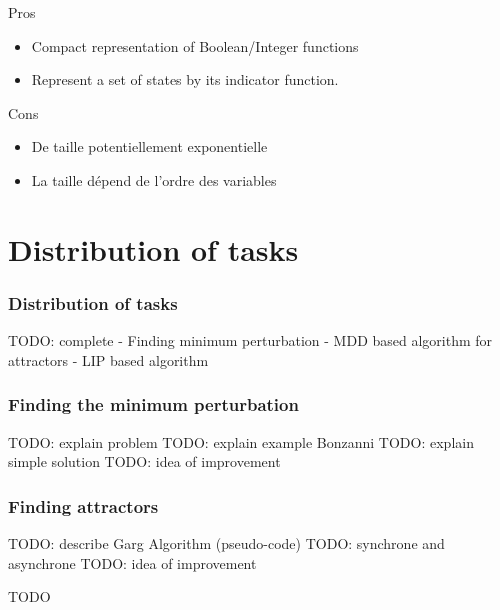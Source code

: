 \documentclass{beamer}
\begin{document}
\begin{frame}

\begin{block}{Pros}
\begin{itemize}
\item Compact representation of Boolean/Integer functions
\item Represent a set of states by its indicator function.
\end{itemize}
\end{block}

\bigskip
\begin{block}{Cons}
\begin{itemize}
\item De taille potentiellement exponentielle
\item La taille dépend de l'ordre des variables
\end{itemize}
\end{block}
\end{frame}


\section{Distribution of tasks}

\begin{frame}
  \frametitle{Distribution of tasks}
  TODO: complete
- Finding minimum perturbation
- MDD based algorithm for attractors
- LIP based algorithm  
  
\end{frame}

\begin{frame}
	\frametitle{Finding the minimum perturbation}
	TODO: explain problem
	TODO: explain example Bonzanni
	TODO: explain simple solution
	TODO: idea of improvement
\end{frame}

\begin{frame}
	\frametitle{Finding attractors}
	TODO: describe Garg Algorithm (pseudo-code)
	TODO: synchrone and asynchrone
	TODO: idea of improvement
\end{frame}

\begin{frame}
	TODO 

\end{frame}
\end{document}
